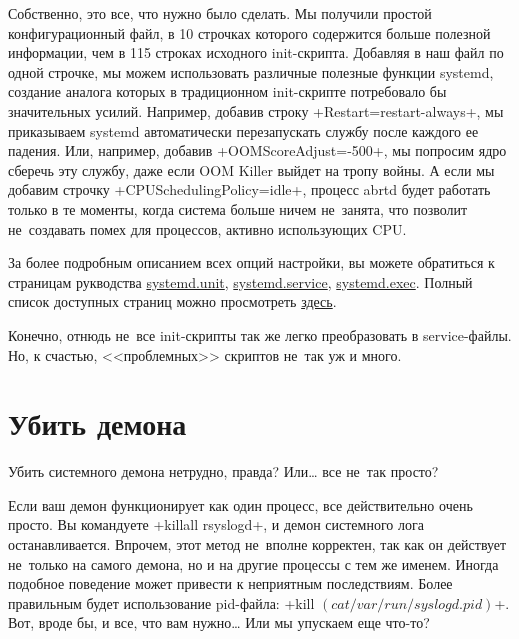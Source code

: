 \documentclass[10pt,oneside,a4paper]{article}
\begin{document}
Собственно, это все, что нужно было сделать. Мы получили простой
конфигурационный файл, в 10 строчках которого содержится больше полезной
информации, чем в 115 строках исходного init-скрипта. Добавляя в наш файл по
одной строчке, мы можем использовать различные полезные функции systemd,
создание аналога которых в традиционном init-скрипте потребовало бы
значительных усилий. Например, добавив строку +Restart=restart-always+, мы
приказываем systemd автоматически перезапускать службу после каждого ее
падения. Или, например, добавив +OOMScoreAdjust=-500+, мы попросим ядро сберечь
эту службу, даже если OOM Killer выйдет на тропу войны. А если мы добавим
строчку +CPUSchedulingPolicy=idle+, процесс abrtd будет работать только в те
моменты, когда система больше ничем не~занята, что позволит не~создавать помех
для процессов, активно использующих CPU. 

За более подробным описанием всех опций настройки, вы можете обратиться к
страницам рукводства
\href{http://0pointer.de/public/systemd-man/systemd.unit.html}{systemd.unit},
\href{http://0pointer.de/public/systemd-man/systemd.service.html}{systemd.service},
\href{http://0pointer.de/public/systemd-man/systemd.exec.html}{systemd.exec}. Полный
список доступных страниц можно просмотреть
\href{http://0pointer.de/public/systemd-man/}{здесь}.

Конечно, отнюдь не~все init-скрипты так же легко преобразовать в
service-файлы. Но, к счастью, <<проблемных>> скриптов не~так уж и много. 

\section{Убить демона}

Убить системного демона нетрудно, правда? Или\ldots{} все не~так просто?

Если ваш демон функционирует как один процесс, все действительно очень просто.
Вы командуете +killall rsyslogd+, и демон системного лога останавливается.
Впрочем, этот метод не~вполне корректен, так как он действует не~только на
самого демона, но и на другие процессы с тем же именем. Иногда подобное
поведение может привести к неприятным последствиям. Более правильным будет
использование pid-файла: +kill $(cat /var/run/syslogd.pid)$+. Вот, вроде
бы, и все, что вам нужно\ldots{} Или мы упускаем еще что-то?
\end{document}
